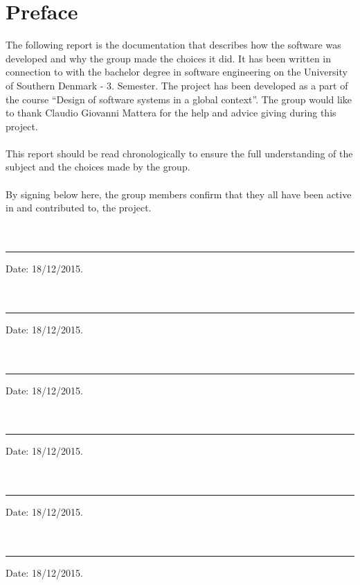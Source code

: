 
\chapter{Preface}
The following report is the documentation that describes how the software was developed and why the group made the choices it did. It has been written in connection to with the bachelor degree in software engineering on the University of Southern Denmark - 3. Semester. The project has been developed as a part of the course “Design of software systems in a global context”. The group would like to thank Claudio Giovanni Mattera for the help and advice giving during this project.
\\
\\
This report should be read chronologically to ensure the full understanding of the subject and the choices made by the group.
\\
\\
By signing below here, the group members confirm that they all have been active in and contributed to, the project.
\\
\\
\\

\noindent\rule{10cm}{0.4pt}                                                                  Date: 18/12/2015.
\\
\\
\\
\noindent\rule{10cm}{0.4pt}                                                                 Date: 18/12/2015.
\\
\\
\\
\noindent\rule{10cm}{0.4pt}                                                                 Date: 18/12/2015.
\\
\\
\\
\noindent\rule{10cm}{0.4pt}                                                                 Date: 18/12/2015.
\\
\\
\\
\noindent\rule{10cm}{0.4pt}                                                                 Date: 18/12/2015.
\\
\\
\\
\noindent\rule{10cm}{0.4pt}                                                                 Date: 18/12/2015.
